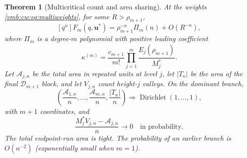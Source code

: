 \documentclass[11pt,a4paper]{article}
\numberwithin{equation}{section}
\newtheorem{theorem}{Theorem}[section]
\theoremstyle{definition}\newtheorem{definition}[theorem]{Definition}
\theoremstyle{remark}\newtheorem{remark}[theorem]{Remark}
\newcommand{\coeff}[2]{[#1^{#2}]}
\newcommand{\calD}{\mathcal D}
\DeclareMathOperator{\Dir}{Dirichlet}
\begin{document}
\begin{theorem}[Multicritical count and area sharing]\label{vmb:cw:thm:dirichlet}
At the weights \eqref{vmb:cw:eq:multiweights}, for some $R>\rho_{m+1}$,
\begin{equation}\label{vmb:cw:eq:multicount}
 \coeff qn F_m(q,\bm u^*)=\rho_{m+1}^{-n}\Pi_m(n)+O(R^{-n}),
\end{equation}
where $\Pi_m$ is a degree-$m$ polynomial with positive leading coefficient
\begin{equation}\label{vmb:cw:eq:multilead}
 \kappa^{(m)}=\frac{c_{m+1}}{m!}
       \prod_{j=1}^{m}\frac{E_j(\rho_{m+1})}{M_j^*}.
\end{equation}
Let $\mathcal A_{j,n}$ be the total area in repeated units at level $j$, let
$|T_n|$ be the area of the final $\calD_{m+1}$ block, and let $V_{j,n}$ count
height-$j$ valleys. On the dominant branch,
\begin{equation}\label{vmb:cw:eq:dirichlet}
 \left(\frac{\mathcal A_{1,n}}n,\ldots,\frac{\mathcal A_{m,n}}n,\frac{|T_n|}n\right)
 \Longrightarrow\Dir(1,\ldots,1),
\end{equation}
with $m+1$ coordinates, and
\begin{equation}\label{vmb:cw:eq:countsareas}
 \frac{M_j^*V_{j,n}-\mathcal A_{j,n}}n\longrightarrow0
 \quad\text{in probability}.
\end{equation}
The total endpoint-run area is tight. The probability of an earlier branch
is $O(n^{-2})$ (exponentially small when $m=1$).
\end{theorem}
\end{document}
